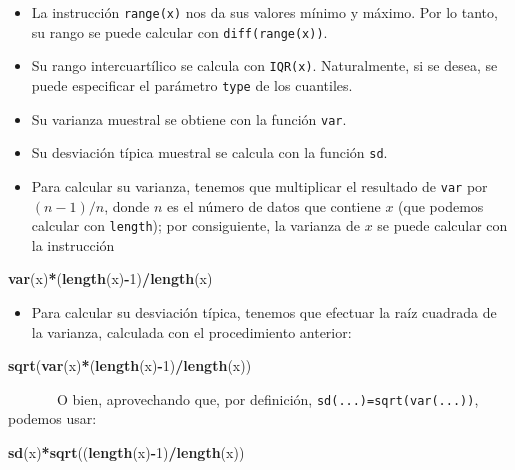 \documentclass[
]{book}
\newenvironment{Shaded}{\begin{snugshade}}{\end{snugshade}}
\newcommand{\DecValTok}[1]{\textcolor[rgb]{0.00,0.00,0.81}{#1}}
\newcommand{\KeywordTok}[1]{\textcolor[rgb]{0.13,0.29,0.53}{\textbf{#1}}}
\newcommand{\NormalTok}[1]{#1}
\newcommand{\OperatorTok}[1]{\textcolor[rgb]{0.81,0.36,0.00}{\textbf{#1}}}
\providecommand{\tightlist}{%
  \setlength{\itemsep}{0pt}\setlength{\parskip}{0pt}}
\theoremstyle{definition}
\theoremstyle{definition}
\theoremstyle{definition}
\theoremstyle{remark}
\begin{document}
\begin{itemize}
\item
  La instrucción \texttt{range(x)} nos da sus valores mínimo y máximo. Por lo tanto, su rango se puede calcular con \texttt{diff(range(x))}.
\item
  Su rango intercuartílico se calcula con \texttt{IQR(x)}. Naturalmente, si se desea, se puede especificar el parámetro \texttt{type} de los cuantiles.
\item
  Su varianza muestral se obtiene con la función \texttt{var}.
\item
  Su desviación típica muestral se calcula con la función \texttt{sd}.
\item
  Para calcular su varianza, tenemos que multiplicar el resultado de \texttt{var} por \((n-1)/n\), donde \(n\) es el número de datos que contiene \(x\) (que podemos calcular con \texttt{length}); por consiguiente, la varianza de \(x\) se puede calcular con la instrucción
\end{itemize}

\begin{Shaded}
\begin{Highlighting}[]
\KeywordTok{var}\NormalTok{(x)}\OperatorTok{*}\NormalTok{(}\KeywordTok{length}\NormalTok{(x)}\OperatorTok{{-}}\DecValTok{1}\NormalTok{)}\OperatorTok{/}\KeywordTok{length}\NormalTok{(x)}
\end{Highlighting}
\end{Shaded}

\begin{itemize}
\tightlist
\item
  Para calcular su desviación típica, tenemos que efectuar la raíz cuadrada de la varianza, calculada con el procedimiento anterior:
\end{itemize}

\begin{Shaded}
\begin{Highlighting}[]
\KeywordTok{sqrt}\NormalTok{(}\KeywordTok{var}\NormalTok{(x)}\OperatorTok{*}\NormalTok{(}\KeywordTok{length}\NormalTok{(x)}\OperatorTok{{-}}\DecValTok{1}\NormalTok{)}\OperatorTok{/}\KeywordTok{length}\NormalTok{(x))}
\end{Highlighting}
\end{Shaded}

~~~~~~~O bien, aprovechando que, por definición, \texttt{sd(...)=sqrt(var(...))}, podemos usar:

\begin{Shaded}
\begin{Highlighting}[]
\KeywordTok{sd}\NormalTok{(x)}\OperatorTok{*}\KeywordTok{sqrt}\NormalTok{((}\KeywordTok{length}\NormalTok{(x)}\OperatorTok{{-}}\DecValTok{1}\NormalTok{)}\OperatorTok{/}\KeywordTok{length}\NormalTok{(x))}
\end{Highlighting}
\end{Shaded}
\end{document}
